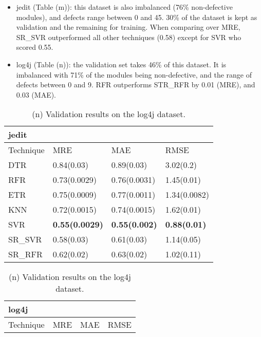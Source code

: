 \documentclass[]{article}
\begin{document}
\begin{itemize}
	\item jedit (Table (m)): this dataset is also imbalanced (76\% non-defective modules), and defects range between 0 and 45. 30\% of the dataset is kept as validation and the remaining for training. When comparing over MRE, SR\_SVR outperformed all other techniques (0.58) except for SVR who scored 0.55. 
	\item log4j (Table (n)): the validation set takes 46\% of this dataset. It is imbalanced with 71\% of the modules being non-defective, and the range of defects between 0 and 9. RFR  outperforms STR\_RFR by 0.01 (MRE), and 0.03 (MAE). 
\end{itemize}
	\begin{table}[h]
		\captionsetup[subtable]{labelformat=empty}
		\begin{adjustwidth}{-3.4cm}{}
			\begin{subtable}{9.5cm}
				\centering
				\caption{(m) Validation results on the jedit dataset.}
				\label{tab:xalan-wv}
				\begin{tabular}{llll}
					\hline
						jedit &              &              &              \\ \hline
						Technique & MRE          & MAE          & RMSE         \\ \hline
						DTR       & 0.84(0.03) & 0.89(0.03) & 3.02(0.2) \\
						RFR       & 0.73(0.0029) & 0.76(0.0031) & 1.45(0.01) \\
						ETR       & 0.75(0.0009) & 0.77(0.0011) & 1.34(0.0082) \\
						KNN       & 0.72(0.0015) & 0.74(0.0015) & 1.62(0.01) \\
						SVR       & \bfseries 0.55(0.0029) & \bfseries 0.55(0.002) & \bfseries 0.88(0.01) \\
						SR\_SVR    & 0.58(0.03) & 0.61(0.03) & 1.14(0.05) \\
						SR\_RFR    & 0.62(0.02) & 0.63(0.02) & 1.02(0.11) \\ \hline
				\end{tabular}
			\end{subtable}
			\begin{subtable}{9.5cm}
				\centering
				\caption{(n) Validation results on the log4j dataset.}
				\label{tab:xerces-wv}
				\begin{tabular}{llll}
					\hline
					log4j &              &             &             \\ \hline
					Technique & MRE          & MAE         & RMSE        \\ \hline

\end{tabular}
\end{subtable}
\end{adjustwidth}
\end{table}
\end{document}
